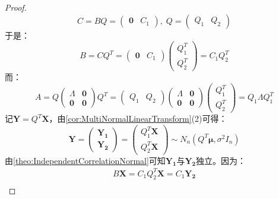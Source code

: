 \begin{proof}
	\begin{equation*}
		C=BQ=
		\begin{pmatrix}
			\mathbf{0} & C_1
		\end{pmatrix},\;
		Q=
		\begin{pmatrix}
			Q_1 & Q_2
		\end{pmatrix}
	\end{equation*}
	于是：
	\begin{equation*}
		B=CQ^T=
		\begin{pmatrix}
			\mathbf{0} & C_1
		\end{pmatrix}
		\begin{pmatrix}
			Q_1^T \\
			Q_2^T
		\end{pmatrix}
		=C_1Q_2^T
	\end{equation*}
	而：
	\begin{equation*}
		A=Q
		\begin{pmatrix}
			\varLambda & \mathbf{0} \\
			\mathbf{0} & \mathbf{0}
		\end{pmatrix}
		Q^T
		=
		\begin{pmatrix}
			Q_1 & Q_2
		\end{pmatrix}
		\begin{pmatrix}
			\varLambda & \mathbf{0} \\
			\mathbf{0} & \mathbf{0}
		\end{pmatrix}
		\begin{pmatrix}
			Q_1^T \\
			Q_2^T
		\end{pmatrix}
		=Q_1\varLambda Q_1^T
	\end{equation*}
	记$\mathbf{Y}=Q^T\mathbf{X}$，由\cref{cor:MultiNormalLinearTransform}(2)可得：
	\begin{equation*}
		\mathbf{Y}=
		\begin{pmatrix}
			\mathbf{Y_1} \\
			\mathbf{Y_2}
		\end{pmatrix}
		=
		\begin{pmatrix}
			Q_1^T\mathbf{X} \\
			Q_2^T\mathbf{X}
		\end{pmatrix}
		\sim N_n(Q^T\boldsymbol{\mu},\sigma^2I_n)
	\end{equation*}
	由\cref{theo:IndependentCorrelationNormal}可知$\mathbf{Y_1}$与$\mathbf{Y_2}$独立。因为：
	\begin{gather*}
		B\mathbf{X}=C_1Q_2^T\mathbf{X}=C_1\mathbf{Y_2} \\

\end{gather*}
\end{proof}
